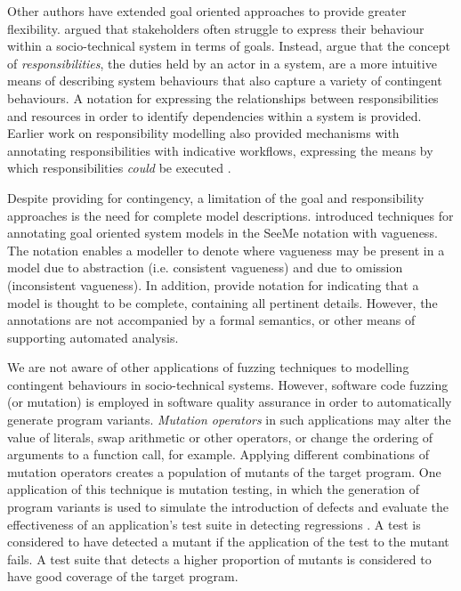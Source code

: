 \documentclass{sig-alternate}
\begin{document}
Other authors have extended goal oriented approaches to provide greater
flexibility.  \citet{sommerville09deriving} argued that stakeholders often
struggle to express their behaviour within a socio-technical system in terms of
goals.  Instead, \citeauthor{sommerville09deriving} argue that the concept of
\emph{responsibilities}, the duties held by an actor in a system, are a more
intuitive means of describing system behaviours that also capture a variety of
contingent behaviours.  A notation for expressing the relationships between
responsibilities and resources in order to identify dependencies within a system
is provided.  Earlier work on responsibility modelling also provided mechanisms
with annotating responsibilities with indicative workflows, expressing the means
by which responsibilities \emph{could} be executed
\citep{dewsbury07responsibility}.

Despite providing for contingency, a limitation of the goal and responsibility
approaches is the need for complete model descriptions. \citet{Herrmann1999}
introduced techniques for annotating goal oriented system models in the SeeMe
notation with vagueness.  The notation enables a modeller to denote where
vagueness may be present in a model due to abstraction (i.e. consistent
vagueness) and due to omission (inconsistent vagueness).  In addition,
\citeauthor{Herrmann1999} provide notation for indicating that a model is
thought to be complete, containing all pertinent details.  However, the
annotations are not accompanied by a formal semantics, or other means of
supporting automated analysis.

We are not aware of other applications of fuzzing techniques to modelling
contingent behaviours in socio-technical systems.  However, software code
fuzzing (or mutation) is employed in software quality assurance in order to
automatically generate program variants.  \emph{Mutation operators} in such
applications may alter the value of literals, swap arithmetic or other
operators, or change the ordering of arguments to a function call, for example.
Applying different combinations of mutation operators creates a population of
mutants of the target program.  One application of this technique is mutation
testing, in which the generation of program variants is used to simulate the
introduction of defects and evaluate the effectiveness of an application's test
suite in detecting regressions \citep{demillo78hints}.  A test is considered to
have detected a mutant if the application of the test to the mutant fails.  A
test suite that detects a higher proportion of mutants is considered to have
good coverage of the target program.
\end{document}
